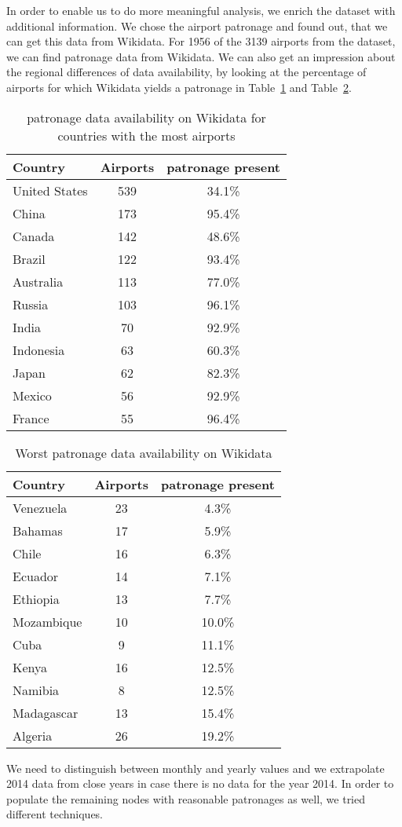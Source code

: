 \documentclass[twocolumn]{tum-article}
\begin{document}
In order to enable us to do more meaningful analysis, we enrich the dataset with additional information. We chose the airport patronage and found out, that we can get this data from Wikidata. 
For 1956 of the 3139 airports from the dataset, we can find patronage data from Wikidata. We can also get an impression about the regional differences of data availability, by looking at the percentage of airports for which Wikidata yields a patronage in Table~\ref{tab:patr_av_most_airports} and Table~\ref{tab:patr_av_worst}.
\begin{table}[h]
	\centering
	\caption{patronage data availability on Wikidata for countries with the most airports}
	\label{tab:patr_av_most_airports}
	\begin{tabular}{|l|c|c|}
		\hline
		Country & Airports & patronage present \\ \hline
		United States & 539 & 34.1\%\\
		China & 173 & 95.4\%\\
		Canada & 142 & 48.6\%\\
		Brazil & 122 & 93.4\%\\
		Australia & 113 & 77.0\%\\
		Russia & 103 & 96.1\%\\
		India & 70 & 92.9\%\\
		Indonesia & 63 & 60.3\%\\
		Japan & 62 & 82.3\%\\
		Mexico & 56 & 92.9\%\\
		France & 55 & 96.4\%\\ \hline
	\end{tabular}
\end{table}
\begin{table}[h]
	\centering
	\caption{Worst patronage data availability on Wikidata}
	\label{tab:patr_av_worst}
	\begin{tabular}{|l|c|c|}
		\hline
		Country & Airports & patronage present \\ \hline
		Venezuela & 23 & 4.3\%\\
		Bahamas & 17 & 5.9\%\\
		Chile & 16 & 6.3\%\\
		Ecuador & 14 & 7.1\%\\
		Ethiopia & 13 & 7.7\%\\ 
		Mozambique & 10 & 10.0\%\\
		Cuba & 9 & 11.1\%\\
		Kenya & 16 & 12.5\%\\
		Namibia & 8 & 12.5\%\\
		Madagascar & 13 & 15.4\%\\
		Algeria & 26 & 19.2\%\\ \hline
	\end{tabular}
\end{table}
We need to distinguish between monthly and yearly values and we extrapolate 2014 data from close years in case there is no data for the year 2014. 
In order to populate the remaining nodes with reasonable patronages as well, we tried different techniques. 
\end{document}
